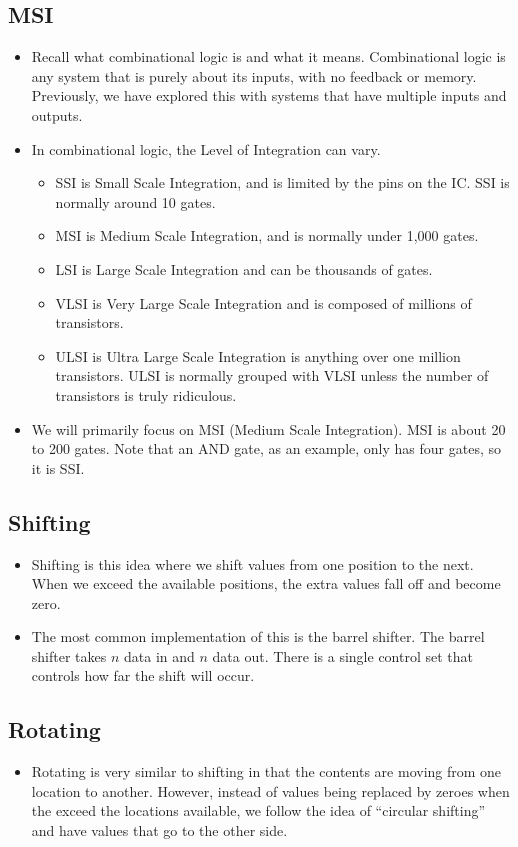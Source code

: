 \documentclass[10pt,a4paper]{article}
\begin{document}
\subsection{MSI}
\begin{itemize}
\item Recall what combinational logic is and what it means. Combinational logic is any system that is purely about its inputs, with no feedback or memory. Previously, we have explored this with systems that have multiple inputs and outputs.
\item In combinational logic, the Level of Integration can vary.
\begin{itemize}
\item SSI is Small Scale Integration, and is limited by the pins on the IC. SSI is normally around 10 gates.
\item MSI is Medium Scale Integration, and is normally under 1,000 gates.
\item LSI is Large Scale Integration and can be thousands of gates.
\item VLSI is Very Large Scale Integration and is composed of millions of transistors.
\item ULSI is Ultra Large Scale Integration is anything over one million transistors. ULSI is normally grouped with VLSI unless the number of transistors is truly ridiculous.
\end{itemize}
\item We will primarily focus on MSI (Medium Scale Integration). MSI is about 20 to 200 gates. Note that an AND gate, as an example, only has four gates, so it is SSI.
\end{itemize}
\subsection{Shifting}
\begin{itemize}
\item Shifting is this idea where we shift values from one position to the next. When we exceed the available positions, the extra values fall off and become zero.
\item The most common implementation of this is the barrel shifter. The barrel shifter takes $n$ data in and $n$ data out. There is a single control set that controls how far the shift will occur.
\end{itemize}
\subsection{Rotating}
\begin{itemize}
\item Rotating is very similar to shifting in that the contents are moving from one location to another. However, instead of values being replaced by zeroes when the exceed the locations available, we follow the idea of ``circular shifting'' and have values that go to the other side.
\end{itemize}
\end{document}
